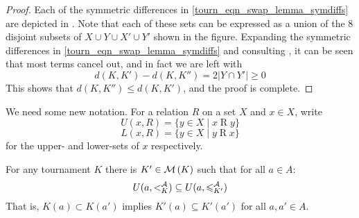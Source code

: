 \begin{proof}
    Each of the symmetric differences in \cref{tourn_eqn_swap_lemma_symdiffs} are
    depicted in . Note that each of these sets can
    be expressed as a union of the 8 disjoint subsets of $X \cup Y \cup X' \cup
    Y'$ shown in the figure. Expanding the symmetric differences in
    \cref{tourn_eqn_swap_lemma_symdiffs} and consulting ,
    it can be seen that most terms cancel out, and in fact we are left with
    \[
        d(K, K') - d(K, K'') = 2|Y \cap Y'|  \ge 0
    \]
    This shows that $d(K, K'') \le d(K, K')$, and the proof is complete.
\end{proof}

We need some new notation. For a relation $R$ on a set $X$ and $x \in X$, write
\[ U(x, R) = \{y \in X \mid x \mathrel{R} y\} \]
\[ L(x, R) = \{y \in X \mid y \mathrel{R} x\} \]
for the upper- and lower-sets of $x$ respectively.

\begin{lemma}
    \label{tourn_result_chainmin_mon_extend_strict_part}
    For any tournament $K$ there is $K' \in \operatorname{\mathcal{M}}\left({K}\right)$ such that for all $a \in
    A$:
    \[
        U(a, {<^{\mathcal{A}}_K}) \subseteq U(a, {\leqslant^{\mathcal{A}}_{K'}})
    \]
    That is, $K(a) \subset K(a')$ implies $K'(a) \subseteq K'(a')$ for all $a,
    a' \in A$.
\end{lemma}

